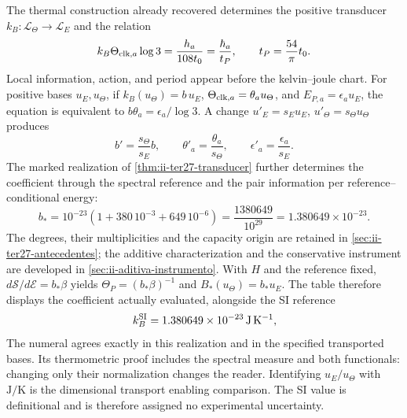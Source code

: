 The thermal construction already recovered determines the positive transducer
\(k_B:\mathcal L_\Theta\to\mathcal L_E\) and the relation
\begin{equation}
 k_B\Theta_{{\rm clk},a}\log3
 =\frac{h_a}{108t_0}=\frac{\hbar_a}{t_P},
 \qquad t_P=\frac{54}{\pi}t_0.
 \label{eq:ii-kb-comparacion}
\end{equation}
Local information, action, and period appear before the kelvin--joule
chart. For positive bases \(u_E,u_\Theta\), if
\(k_B(u_\Theta)=b\,u_E\),
\(\Theta_{{\rm clk},a}=\theta_a u_\Theta\), and
\(E_{P,a}=\epsilon_a u_E\), the equation is equivalent to
\(b\theta_a=\epsilon_a/\log3\). A change
\(u'_E=s_Eu_E\), \(u'_\Theta=s_\Theta u_\Theta\) produces
\[
 b'=\frac{s_\Theta}{s_E}b,\qquad
 \theta'_a=\frac{\theta_a}{s_\Theta},\qquad
 \epsilon'_a=\frac{\epsilon_a}{s_E}.
\]
The marked realization of \ref{thm:ii-ter27-transducer} further
determines the coefficient through the spectral reference and the pair
information per reference--conditional energy:
\begin{equation}
 b_*=10^{-23}\left(1+380\,10^{-3}+649\,10^{-6}\right)
     =\frac{1380649}{10^{29}}=1.380649\times10^{-23}.
 \label{eq:ii-b-evaluacion-comparada}
\end{equation}
The degrees, their multiplicities and the capacity origin are retained
in \ref{sec:ii-ter27-antecedentes}; the additive characterization and
the conservative instrument are developed in
\ref{sec:ii-aditiva-instrumento}. With $H$ and the reference fixed,
$d\mathcal S/d\mathcal E=b_*\beta$ yields
$\Theta_P=(b_*\beta)^{-1}$ and $B_*(u_\Theta)=b_*u_E$.
The table therefore displays the coefficient actually evaluated,
alongside the SI reference
\[
 k_B^{\rm SI}=1.380649\times10^{-23}\,\mathrm{J\,K^{-1}},
\]
The numeral agrees exactly in this realization and in the specified
transported bases. Its thermometric proof includes the spectral measure
and both functionals: changing only their normalization changes the reader.
Identifying $u_E/u_\Theta$ with $\mathrm{J/K}$ is the dimensional
transport enabling comparison. The SI value is definitional and is
therefore assigned no experimental uncertainty.

